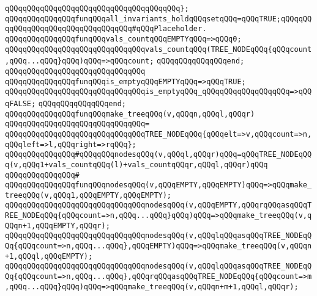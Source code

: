 \verb|qQQqqQQqqQQqqQQqqQQqqQQqqQQqqQQqqQQqqQQq};|\newline
\newline
\verb|qQQqqQQqqQQqqQQqfunqQQqall_invariants_holdqQQqsetqQQq=qQQqTRUE;qQQqqQQqqQQqqQQqqQQqqQQqqQQqqQQqqQQq#qQQqPlaceholder.|\newline
\newline
\verb|qQQqqQQqqQQqqQQqfunqQQqvals_countqQQqEMPTYqQQq=>qQQq0;|\newline
\verb|qQQqqQQqqQQqqQQqqQQqqQQqqQQqqQQqvals_countqQQq(TREE_NODEqQQq{qQQqcount,qQQq...qQQq}qQQq)qQQq=>qQQqcount;|\newline
\verb|qQQqqQQqqQQqqQQqend;|\newline
\verb|qQQqqQQqqQQqqQQqqQQqqQQqqQQqqQQq|\newline
\verb|qQQqqQQqqQQqqQQqfunqQQqis_emptyqQQqEMPTYqQQq=>qQQqTRUE;|\newline
\verb|qQQqqQQqqQQqqQQqqQQqqQQqqQQqqQQqis_emptyqQQq_qQQqqQQqqQQqqQQqqQQq=>qQQqFALSE;|\newline
\verb|qQQqqQQqqQQqqQQqend;|\newline
\newline
\verb|qQQqqQQqqQQqqQQqfunqQQqmake_treeqQQq(v,qQQqn,qQQql,qQQqr)|\newline
\verb|qQQqqQQqqQQqqQQqqQQqqQQqqQQqqQQq=|\newline
\verb|qQQqqQQqqQQqqQQqqQQqqQQqqQQqqQQqTREE_NODEqQQq{qQQqelt=>v,qQQqcount=>n,qQQqleft=>l,qQQqright=>rqQQq};|\newline
\newline
\verb|qQQqqQQqqQQqqQQq#qQQqqQQqnodesqQQq(v,qQQql,qQQqr)qQQq=qQQqTREE_NODEqQQq(v,qQQq1+vals_countqQQq(l)+vals_countqQQqr,qQQql,qQQqr)qQQq|\newline
\verb|qQQqqQQqqQQqqQQq#|\newline
\verb|qQQqqQQqqQQqqQQqfunqQQqnodesqQQq(v,qQQqEMPTY,qQQqEMPTY)qQQq=>qQQqmake_treeqQQq(v,qQQq1,qQQqEMPTY,qQQqEMPTY);|\newline
\verb|qQQqqQQqqQQqqQQqqQQqqQQqqQQqqQQqnodesqQQq(v,qQQqEMPTY,qQQqrqQQqasqQQqTREE_NODEqQQq{qQQqcount=>n,qQQq...qQQq}qQQq)qQQq=>qQQqmake_treeqQQq(v,qQQqn+1,qQQqEMPTY,qQQqr);|\newline
\verb|qQQqqQQqqQQqqQQqqQQqqQQqqQQqqQQqnodesqQQq(v,qQQqlqQQqasqQQqTREE_NODEqQQq{qQQqcount=>n,qQQq...qQQq},qQQqEMPTY)qQQq=>qQQqmake_treeqQQq(v,qQQqn+1,qQQql,qQQqEMPTY);|\newline
\verb|qQQqqQQqqQQqqQQqqQQqqQQqqQQqqQQqnodesqQQq(v,qQQqlqQQqasqQQqTREE_NODEqQQq{qQQqcount=>n,qQQq...qQQq},qQQqrqQQqasqQQqTREE_NODEqQQq{qQQqcount=>m,qQQq...qQQq}qQQq)qQQq=>qQQqmake_treeqQQq(v,qQQqn+m+1,qQQql,qQQqr);|\newline
